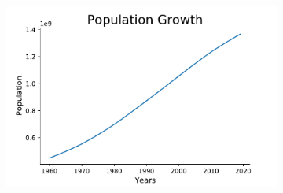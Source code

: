 \documentclass[twoside,12pt]{report}  %
\begin{document}
\begin{figure}[H]
	\centering
	
	\begin{subfigure}[b]{0.5\textwidth}
		\includegraphics[width=\textwidth]{./images/linegraph_example.pdf}
		\label{linegraph_univariate_example}
	\end{subfigure}
	

\end{figure}
\end{document}
